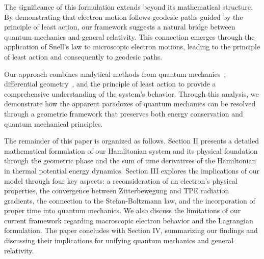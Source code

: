 \documentclass[%
 reprint,
 amsmath,amssymb,
 aps,
]{revtex4-1}
\numberwithin{equation}{section}%
\begin{document}
The significance of this formulation extends beyond its mathematical structure. By demonstrating that electron motion follows geodesic paths guided by the principle of least action, our framework suggests a natural bridge between quantum mechanics and general relativity. This connection emerges through the application of Snell's law to microscopic electron motions, leading to the principle of least action and consequently to geodesic paths.

Our approach combines analytical methods from quantum mechanics~\cite{griffiths2018}, differential geometry~\cite{shapere1989}, and the principle of least action to provide a comprehensive understanding of the system's behavior. Through this analysis, we demonstrate how the apparent paradoxes of quantum mechanics can be resolved through a geometric framework that preserves both energy conservation and quantum mechanical principles.

The remainder of this paper is organized as follows. Section II presents a detailed mathematical formulation of our Hamiltonian system and its physical foundation through the geometric phase and the sum of time derivatives of the Hamiltonian in thermal potential energy dynamics. Section III explores the implications of our model through four key aspects: a reconsideration of an electron's physical properties, the convergence between Zitterbewegung and TPE radiation gradients, the connection to the Stefan-Boltzmann law, and the incorporation of proper time into quantum mechanics. We also discuss the limitations of our current framework regarding macroscopic electron behavior and the Lagrangian formulation. The paper concludes with Section IV, summarizing our findings and discussing their implications for unifying quantum mechanics and general relativity.


\end{document}

